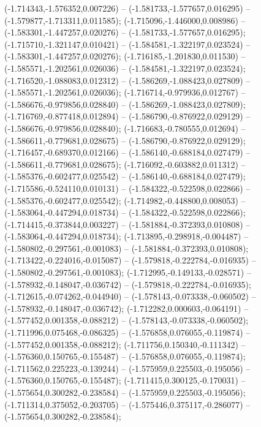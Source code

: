  (-1.714343,-1.576352,0.007226) -- (-1.581733,-1.577657,0.016295) -- (-1.579877,-1.713311,0.011585);
 (-1.715096,-1.446000,0.008986) -- (-1.583301,-1.447257,0.020276) -- (-1.581733,-1.577657,0.016295);
 (-1.715710,-1.321147,0.010421) -- (-1.584581,-1.322197,0.023524) -- (-1.583301,-1.447257,0.020276);
 (-1.716185,-1.201830,0.011530) -- (-1.585571,-1.202561,0.026036) -- (-1.584581,-1.322197,0.023524);
 (-1.716520,-1.088083,0.012312) -- (-1.586269,-1.088423,0.027809) -- (-1.585571,-1.202561,0.026036);
 (-1.716714,-0.979936,0.012767) -- (-1.586676,-0.979856,0.028840) -- (-1.586269,-1.088423,0.027809);
 (-1.716769,-0.877418,0.012894) -- (-1.586790,-0.876922,0.029129) -- (-1.586676,-0.979856,0.028840);
 (-1.716683,-0.780555,0.012694) -- (-1.586611,-0.779681,0.028675) -- (-1.586790,-0.876922,0.029129);
 (-1.716457,-0.689370,0.012166) -- (-1.586140,-0.688184,0.027479) -- (-1.586611,-0.779681,0.028675);
 (-1.716092,-0.603882,0.011312) -- (-1.585376,-0.602477,0.025542) -- (-1.586140,-0.688184,0.027479);
 (-1.715586,-0.524110,0.010131) -- (-1.584322,-0.522598,0.022866) -- (-1.585376,-0.602477,0.025542);
 (-1.714982,-0.448800,0.008053) -- (-1.583064,-0.447294,0.018734) -- (-1.584322,-0.522598,0.022866);
 (-1.714415,-0.373844,0.003227) -- (-1.581884,-0.372393,0.010808) -- (-1.583064,-0.447294,0.018734);
 (-1.713895,-0.298918,-0.004487) -- (-1.580802,-0.297561,-0.001083) -- (-1.581884,-0.372393,0.010808);
 (-1.713422,-0.224016,-0.015087) -- (-1.579818,-0.222784,-0.016935) -- (-1.580802,-0.297561,-0.001083);
 (-1.712995,-0.149133,-0.028571) -- (-1.578932,-0.148047,-0.036742) -- (-1.579818,-0.222784,-0.016935);
 (-1.712615,-0.074262,-0.044940) -- (-1.578143,-0.073338,-0.060502) -- (-1.578932,-0.148047,-0.036742);
 (-1.712282,0.000603,-0.064191) -- (-1.577452,0.001358,-0.088212) -- (-1.578143,-0.073338,-0.060502);
 (-1.711996,0.075468,-0.086325) -- (-1.576858,0.076055,-0.119874) -- (-1.577452,0.001358,-0.088212);
 (-1.711756,0.150340,-0.111342) -- (-1.576360,0.150765,-0.155487) -- (-1.576858,0.076055,-0.119874);
 (-1.711562,0.225223,-0.139244) -- (-1.575959,0.225503,-0.195056) -- (-1.576360,0.150765,-0.155487);
 (-1.711415,0.300125,-0.170031) -- (-1.575654,0.300282,-0.238584) -- (-1.575959,0.225503,-0.195056);
 (-1.711314,0.375052,-0.203705) -- (-1.575446,0.375117,-0.286077) -- (-1.575654,0.300282,-0.238584);
